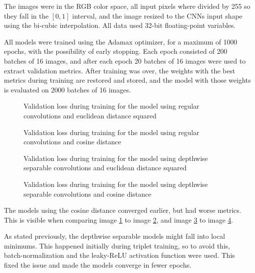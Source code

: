 \documentclass[runningheads]{llncs}
\begin{document}
The images were in the RGB color space, all input pixels where divided by 255 so they fall in the $\left[0, 1\right]$ interval, and the image resized to the CNNs input shape using the bi-cubic interpolation. All data used 32-bit floating-point variables. 

All models were trained using the Adamax optimizer, for a maximum of 1000 epochs, with the possibility of early stopping. Each epoch consisted of 200 batches of 16 images, and after each epoch 20 batches of 16 images were used to extract validation metrics. After training was over, the weights with the best metrics during training are restored and stored, and the model with those weights is evaluated on 2000 batches of 16 images.

\begin{figure}
    
    \caption{Validation loss during training for the model using regular convolutions and euclidean distance squared}
    \label{triplet_regular_eucl}
\end{figure}

\begin{figure}
    
    \caption{Validation loss during training for the model using regular convolutions and cosine distance}
    \label{triplet_regular_cos}
\end{figure}

\begin{figure}
    
    \caption{Validation loss during training for the model using depthwise separable convolutions and euclidean distance squared}
    \label{triplet_separable_eucl}
\end{figure}

\begin{figure}
    
    \caption{Validation loss during training for the model using depthwise separable convolutions and cosine distance}
    \label{triplet_separable_cos}
\end{figure}

The models using the cosine distance converged earlier, but had worse metrics. This is visible when comparing image \ref{triplet_regular_eucl} to image \ref{triplet_regular_cos}, and image \ref{triplet_separable_eucl} to image \ref{triplet_separable_cos}.

As stated previously, the depthwise separable models might fall into local minimums. This happened initially during triplet training, so to avoid this, batch-normalization\cite{ioffe2015batch} and the leaky-ReLU activation function were used. This fixed the issue and made the models converge in fewer epochs.
\end{document}
